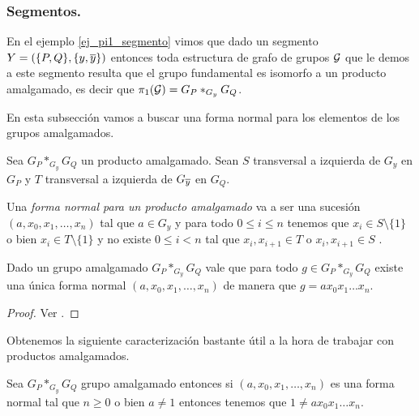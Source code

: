 \documentclass[tesis.tex]{subfiles}
\begin{document}
\subsubsection{Segmentos.}\label{subsub_segmento}

En el ejemplo \ref{ej_pi1_segmento} vimos que dado un segmento $Y = (\{P,Q\}, \{y, \overline y\}  )$ entonces toda estructura de grafo de grupos ${\cal G}$ que le demos a este segmento
resulta que el grupo fundamental es isomorfo a un producto amalgamado, es decir que $\pi_1({\cal G}) = G_P \ast_{G_y} G_Q$. 

En esta subsección vamos a buscar una forma normal para los elementos de los grupos amalgamados.
\begin{deff}\label{deff_amalgamado_fn}
	Sea $G_P \ast_{G_y} G_Q$ un producto amalgamado.
	Sean $S$ transversal a izquierda de $G_{y}$ en $G_P$ y $T$ transversal a izquierda de $G_{\overline y}$ en $G_{Q}$.
	
	Una \emph{forma normal para un producto amalgamado} va a ser una sucesión
	$(a,x_0,x_1,\dots, x_n)$ tal que $a \in G_{y}$ y para todo $0\le  i \le n$ tenemos que $x_{i} \in S \setminus \{ 1 \}$ o bien $x_{i} \in T \setminus \{ 1 \}$ y no 
	existe $ 0 \le i  < n$ tal que  $x_{i}, x_{i+1} \in T$ o $x_{i}, x_{i+1} \in S$ .	
\end{deff}

\begin{prop}\label{prop_amalgamado_formanormal}
	Dado un grupo amalgamado $G_P \ast_{G_y} G_Q$
	vale que para todo $g \in G_P \ast_{G_y} G_Q$ 
	existe una única forma normal $(a,x_0,x_1,\dots,x_n)$ de manera que $g= ax_0x_1\dots x_n$.
\end{prop}
\begin{proof}
	Ver \cite[p.187]{lyndon1977combinatorial}.
\end{proof}
 
Obtenemos la siguiente caracterización bastante útil a la hora de trabajar con productos amalgamados.
	
\begin{coro}\label{coro_amalgamado_neq_1}
	Sea $G_P \ast_{G_y} G_Q$ grupo amalgamado entonces si $(a,x_0,x_1,\dots,x_n)$ es una forma normal tal que $n \ge 0$ o bien $a \neq 1$
	entonces tenemos que $1 \neq ax_0x_1\dots x_n$.
\end{coro}
\end{document}
